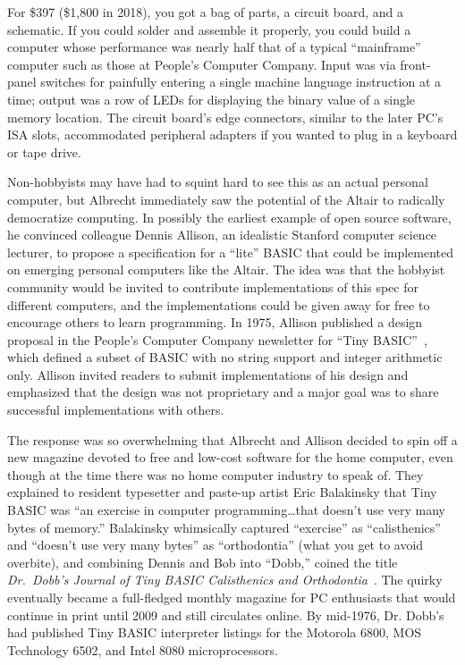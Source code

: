 For \$397 (\$1,800 in 2018), you got a bag of parts, a
circuit board, and a schematic.  If you could solder and assemble it properly, you 
could build a computer whose performance was nearly half that of a typical
``mainframe'' computer such as those at People's Computer Company.
Input was via
front-panel switches for painfully entering a
single machine language instruction at a time; output was a row of  LEDs for
displaying the binary value of a single memory location.  The circuit board's
edge connectors, similar to the later PC's ISA slots, accommodated 
peripheral adapters if you wanted to plug in a keyboard or tape drive.


Non-hobbyists may have had to squint
hard to see this as an actual personal computer,
but Albrecht
immediately saw the potential of the Altair to radically democratize computing.
In possibly the earliest example of open source software, he
convinced colleague Dennis Allison, an idealistic Stanford computer
science lecturer, to propose a specification for a ``lite'' BASIC that could
be implemented on emerging personal
computers like the Altair.
The idea was that the hobbyist community would be invited to contribute
implementations of this spec for different computers, and the
implementations could be given away for free to encourage others to
learn programming.
In 1975, Allison published a design proposal in the People's Computer
Company newsletter for ``Tiny
BASIC''~\cite{allison_tiny_basic}, which defined 
a subset of BASIC with no string support and integer arithmetic only.
Allison invited readers to submit implementations of his design and
emphasized that the design was not proprietary and a major goal was to
share successful implementations with others.

The response was so overwhelming that Albrecht and Allison
decided to spin off a new magazine devoted to free and low-cost software
for the home computer, even though at the time there was no home
computer industry to speak of.
They explained to resident typesetter
and paste-up artist Eric Balakinsky that Tiny BASIC was ``an exercise in
computer programming\ldots{}that doesn't use very many bytes of
memory.''
Balakinsky whimsically captured ``exercise'' as
``calisthenics'' and ``doesn't use very many bytes'' as ``orthodontia''
(what you get to avoid overbite), and combining Dennis and Bob into
``Dobb,'' coined the title \emph{Dr.~Dobb's Journal of Tiny BASIC
Calisthenics and Orthodontia}~\cite[p.~265]{dormouse}.
The quirky  eventually became a
full-fledged monthly magazine for PC enthusiasts that
would continue in print until 2009 and still circulates online.
By mid-1976, Dr. Dobb's had published Tiny BASIC interpreter listings
for the Motorola 6800, MOS Technology 6502, and Intel 8080 microprocessors.

